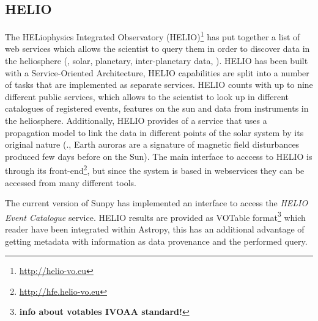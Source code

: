 \subsection{HELIO}\label{ssec:helio}

The HELiophysics Integrated Observatory (HELIO)\footnote{\url{http://helio-vo.eu}} has put together a list of web services which allows the scientist to query them in order to discover data in the heliosphere (\eg, solar, planetary, inter-planetary data, \cdots)\citep{dps2012}. 
HELIO has been built with a Service-Oriented Architecture, 
\ie HELIO capabilities are split into a number of tasks that are implemented as separate services. 
HELIO counts with up to nine different public services, which allows to the scientist to look up in different catalogues of registered events, features on the sun and data from instruments in the heliosphere. 
Additionally, HELIO provides of a service that uses a propagation model to link the data in different points of the solar system by its original nature 
(\eg., Earth auroras are a signature of magnetic field disturbances produced few days before on the Sun).
The main interface to acccess to HELIO is through its front-end\footnote{
\url{http://hfe.helio-vo.eu}},
but since the system is based in webservices they can be accessed from many different tools.

The current version of Sunpy has implemented an interface to access the \textit{HELIO Event Catalogue} service.  
HELIO results are provided as VOTable format\footnote{\bf{info about votables IVOAA standard!}} 
which reader have been integrated within Astropy, this has an additional advantage of getting metadata with information as data provenance and the performed query.


